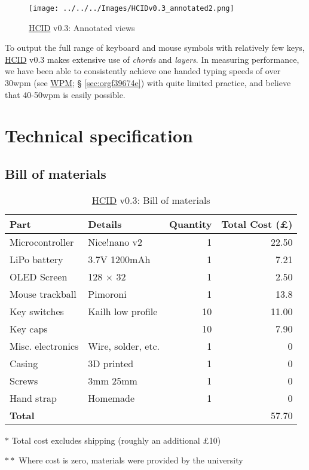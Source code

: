 \documentclass[logo,bsc,singlespacing,parskip]{infthesis}
\begin{document}
\begin{figure}[h]
\centering
\texttt{[image: ../../../Images/HCIDv0.3\_annotated2.png]}
\caption{\hyperref[org917851e]{HCID} v0.3: Annotated views}
\end{figure}

To output the full range of keyboard and mouse symbols with relatively few keys, \hyperref[org917851e]{HCID} v0.3 makes extensive use of \emph{chords} and \emph{layers}. In measuring performance, we have been able to consistently achieve one handed typing speeds of over 30wpm (see \hyperref[sec:orgf39674e]{WPM}; § \ref{sec:orgf39674e}) with quite limited practice, and believe that 40-50wpm is easily possible.
\section{Technical specification}
\label{sec:org318e589}
\subsection{Bill of materials}
\label{sec:org5ca336b}
\begin{table}
\begin{threeparttable}
\begin{tabular}{llrr}
\toprule
\textbf{Part} & \textbf{Details} & \textbf{Quantity} & \textbf{Total Cost (£)}\\
\midrule
Microcontroller & Nice!nano v2 \autocite{NiceNanoNice} & 1 & 22.50\\
LiPo battery & 3.7V 1200mAh \autocite{adafruitLiPo} & 1 & 7.21\\
OLED Screen & 128 \(\times\) 32 \autocite{128X32OLEDScreen} & 1 & 2.50\\
Mouse trackball & Pimoroni \autocite{TrackballBreakoutPimoroni} & 1 & 13.8\\
Key switches & Kailh low profile \autocite{Mechboards} & 10 & 11.00\\
Key caps & \autocite{Mechboards} & 10 & 7.90\\
Misc. electronics & Wire, solder, etc. & 1 & 0\\
Casing & 3D printed & 1 & 0\\
Screws & 3mm \texttimes{} 25mm & 1 & 0\\
Hand strap & Homemade & 1 & 0\\
\midrule
\textbf{Total} &  &  & 57.70\\
\bottomrule
\end{tabular}
\begin{tablenotes}
\item[] \(\ast\) Total cost excludes shipping (roughly an additional £10)
\item[] \(\ast \ast\) Where cost is zero, materials were provided by the university
\end{tablenotes}
\caption{\label{tab:bom}\hyperref[org917851e]{HCID} v0.3: Bill of materials}
\end{threeparttable}
\end{table}
\end{document}
